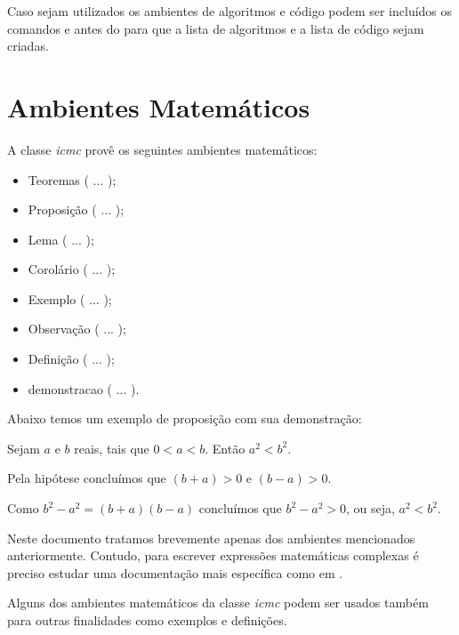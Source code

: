 Caso sejam utilizados os ambientes de algoritmos e código podem ser incluídos os comandos  e  antes do  para que a lista de algoritmos e a lista de código sejam criadas.


\section{Ambientes Matemáticos}

A classe \textit{icmc} provê os seguintes ambientes matemáticos:
\begin{itemize}
 \item Teoremas ( ... );
 \item Proposição ( ... );
 \item Lema ( ... );
 \item Corolário ( ... );
 \item Exemplo ( ... );
 \item Observação ( ... );
 \item Definição ( ... );
 \item demonstracao ( ... ).
\end{itemize}

Abaixo temos um exemplo de proposição com sua demonstração:
\begin{proposicao}
 Sejam $a$ e $b$ reais, tais que $0<a<b$. Então $a^2<b^2$.
\end{proposicao}
\begin{demonstracao}
 Pela hipótese concluímos que $(b+a)>0$ e $(b-a)>0$.

Como $b^2-a^2=(b+a)(b-a)$ concluímos que $b^2-a^2>0$, ou seja, $a^2<b^2$.
\end{demonstracao}

Neste documento tratamos brevemente apenas dos ambientes mencionados anteriormente. Contudo, para escrever expressões matemáticas complexas é preciso estudar uma documentação mais específica como em .

Alguns dos ambientes matemáticos da classe \textit{icmc} podem ser usados também para outras finalidades como exemplos e definições.